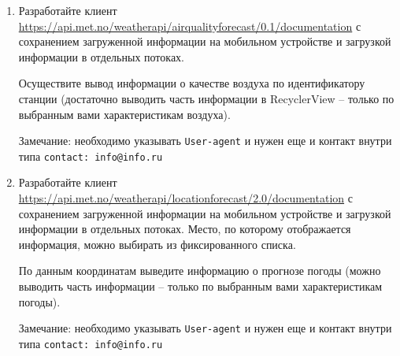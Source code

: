 \begin{enumerate}
	\item Разработайте клиент \url{https://api.met.no/weatherapi/airqualityforecast/0.1/documentation} с сохранением загруженной информации на мобильном устройстве и загрузкой
		информации в отдельных потоках. 

		Осуществите вывод информации о качестве воздуха по идентификатору станции (достаточно выводить часть информации в RecyclerView -- только
		по выбранным вами характеристикам воздуха).

		Замечание: необходимо указывать \verb|User-agent| и нужен еще и контакт внутри типа \verb|contact: info@info.ru|








	\item Разработайте клиент \url{https://api.met.no/weatherapi/locationforecast/2.0/documentation} с сохранением загруженной информации на мобильном устройстве и загрузкой
		информации в отдельных потоках. Место, по которому отображается информация, можно выбирать из фиксированного списка.

		По данным координатам выведите информацию о прогнозе погоды (можно выводить часть информации -- только по выбранным вами характеристикам
		погоды).

		Замечание: необходимо указывать \verb|User-agent| и нужен еще и контакт внутри типа \verb|contact: info@info.ru|




\end{enumerate}

